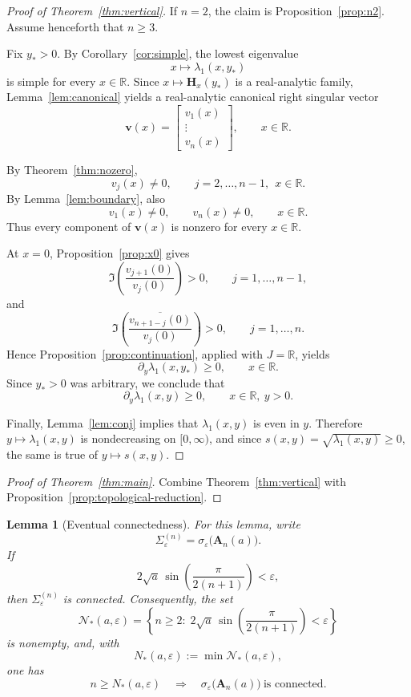 \documentclass[11pt]{article}
\numberwithin{equation}{section}
\newtheorem{lemma}[theorem]{Lemma}
\begin{document}
\begin{proof}[Proof of Theorem~\ref{thm:vertical}]
If $n=2$, the claim is Proposition~\ref{prop:n2}.  Assume henceforth that
$n\ge3$.

Fix $y_*>0$.  By Corollary~\ref{cor:simple}, the lowest eigenvalue
\[
x\longmapsto \lambda_1(x,y_*)
\]
is simple for every $x\in\mathbb{R}$.  Since $x\mapsto \mathbf H_x(y_*)$ is a
real-analytic family, Lemma~\ref{lem:canonical} yields a real-analytic
canonical right singular vector
\[
\bm v(x)=
\begin{bmatrix}
v_1(x)\\
\vdots\\
v_n(x)
\end{bmatrix},
\qquad
x\in\mathbb{R}.
\]

By Theorem~\ref{thm:nozero},
\[
v_j(x)\neq0,
\qquad
j=2,\dots,n-1,\ \ x\in\mathbb{R}.
\]
By Lemma~\ref{lem:boundary}, also
\[
v_1(x)\neq0,
\qquad
v_n(x)\neq0,
\qquad
x\in\mathbb{R}.
\]
Thus every component of $\bm v(x)$ is nonzero for every $x\in\mathbb{R}$.

At $x=0$, Proposition~\ref{prop:x0} gives
\[
\Im\!\left(\frac{v_{j+1}(0)}{v_j(0)}\right)>0,
\qquad
j=1,\dots,n-1,
\]
and
\[
\Im\!\left(\frac{\overline{v_{n+1-j}(0)}}{v_j(0)}\right)>0,
\qquad
j=1,\dots,n.
\]
Hence Proposition~\ref{prop:continuation}, applied with $J=\mathbb{R}$, yields
\[
\partial_y\lambda_1(x,y_*)\ge0,
\qquad
x\in\mathbb{R}.
\]
Since $y_*>0$ was arbitrary, we conclude that
\[
\partial_y\lambda_1(x,y)\ge0,
\qquad
x\in\mathbb{R},\ y>0.
\]

Finally, Lemma~\ref{lem:conj} implies that $\lambda_1(x,y)$ is even in $y$.
Therefore $y\mapsto \lambda_1(x,y)$ is nondecreasing on $[0,\infty)$, and
since $s(x,y)=\sqrt{\lambda_1(x,y)}\ge0$, the same is true of $y\mapsto s(x,y)$.
\end{proof}

\begin{proof}[Proof of Theorem~\ref{thm:main}]
Combine Theorem~\ref{thm:vertical} with
Proposition~\ref{prop:topological-reduction}.
\end{proof}

\begin{lemma}[Eventual connectedness]\label{lem:eventual-connectedness}
For this lemma, write
\[
\Sigma_\varepsilon^{(n)}
=
\sigma_\varepsilon\bigl(\mathbf A_n(a)\bigr).
\]
If
\[
2\sqrt a\,\sin\!\left(\frac{\pi}{2(n+1)}\right)<\varepsilon,
\]
then \(\Sigma_\varepsilon^{(n)}\) is connected.  Consequently, the set
\[
\mathcal N_*(a,\varepsilon)
=
\left\{
n\ge2:\;
2\sqrt a\,\sin\!\left(\frac{\pi}{2(n+1)}\right)<\varepsilon
\right\}
\]
is nonempty, and, with
\[
N_*(a,\varepsilon):=\min \mathcal N_*(a,\varepsilon),
\]
one has
\[
n\ge N_*(a,\varepsilon)
\quad\Longrightarrow\quad
\sigma_\varepsilon\bigl(\mathbf A_n(a)\bigr)\ \text{is connected}.
\]
\end{lemma}
\end{document}
